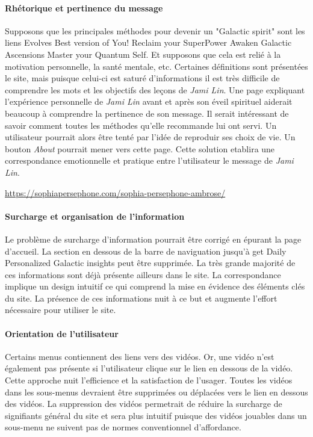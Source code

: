 \documentclass[9pt]{report}
\begin{document}
\begin{multicols*}{2}
\paragraph{Rhétorique et pertinence du message}
Supposons que les principales méthodes pour devenir un "Galactic spirit" sont les liens Evolves Best version of You! Reclaim your SuperPower Awaken Galactic Ascensions Master your Quantum Self. Et supposons que cela est relié 
à la motivation personnelle, la santé mentale, etc. Certaines définitions sont présentées le site, mais puisque celui-ci est saturé d’informations il est très difficile de comprendre les mots et les objectifs des leçons de \textit{\textit{Jami Lin}}. Une page expliquant l’expérience personnelle de \textit{\textit{Jami Lin}} avant et après son éveil spirituel aiderait beaucoup à comprendre la pertinence de son message. Il serait intéressant de savoir comment toutes les méthodes qu’elle recommande lui ont servi. Un utilisateur pourrait alors être tenté 
par l'idée de reproduir ses choix de vie. Un bouton \textit{About} pourrait mener vers cette page. Cette solution etablira une correspondance  emotionnelle et pratique entre l’utilisateur le message de \textit{\textit{Jami Lin}}.

\begin{EExample}{}{}
  \href{ https://sophiapersephone.com/sophia-persephone-ambrose/}{ https://sophiapersephone.com/sophia-persephone-ambrose/}
\end{EExample}


\paragraph{Surcharge et organisation de l’information}
Le problème de surcharge d’information pourrait être corrigé en épurant la page d’accueil. La section en dessous de la barre de naviguation jusqu’à get Daily Personalized Galactic insights peut être supprimée. La très grande majorité de ces informations sont déjà présente ailleurs dans le site. La correspondance implique un design intuitif ce qui comprend la mise en évidence des éléments clés du site. La présence de ces informations nuit à ce but et augmente l’effort nécessaire pour utiliser le site.



\paragraph{Orientation de l’utilisateur}
Certains menus contiennent des liens vers des vidéos. Or, une vidéo n’est également pas présente si l’utilisateur clique sur le lien en dessous de la vidéo. Cette approche nuit l’efficience et la satisfaction de l’usager. Toutes les vidéos dans les sous-menus devraient être supprimées ou déplacées vers le lien en dessous des vidéos. La suppression des vidéos permetrait de réduire la surcharge de signifiants général du site et sera plus intuitif puisque des vidéos jouables dans un sous-menu ne suivent pas de normes conventionnel d’affordance. 


\end{multicols*}
\end{document}
